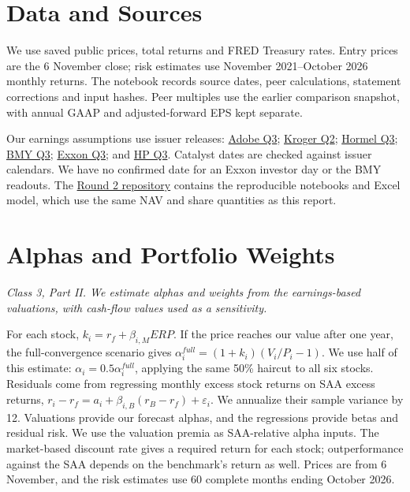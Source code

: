 \documentclass[10pt,a4paper]{article}
\begin{document}
\section*{Data and Sources}
\begingroup\small
We use saved public prices, total returns and FRED Treasury rates. Entry prices are the 6 November close; risk estimates use November 2021--October 2026 monthly returns. The notebook records source dates, peer calculations, statement corrections and input hashes. Peer multiples use the earlier comparison snapshot, with annual GAAP and adjusted-forward EPS kept separate.

Our earnings assumptions use issuer releases: \href{https://www.sec.gov/Archives/edgar/data/796343/000079634326000147/adbeex991q326.htm}{Adobe Q3}; \href{https://ir.kroger.com/news/news-details/2026/Kroger-Reports-Second-Quarter-2026-Results-and-Updates-Guidance-for-2026/default.aspx}{Kroger Q2}; \href{https://www.hormelfoods.com/wp-content/uploads/Hormel-Earnings-Release-Q3-2026_FINAL.pdf}{Hormel Q3}; \href{https://www.bms.com/assets/bms/us/en-us/pdf/investor-info/doc_financials/quarterly_reports/2026/BMY-Q3-2026-Earnings-Press-Release-0039.pdf}{BMY Q3}; \href{https://investor.exxonmobil.com/company-information/press-releases/detail/1213/exxonmobil-announces-third-quarter-2026-results}{Exxon Q3}; and \href{https://www.hp.com/content/dam/sites/garage-press/press/press-releases/2026/q3-fy26-earnings/HP_Inc_Reports_Q3FY26_Earnings.pdf}{HP Q3}. Catalyst dates are checked against issuer calendars. We have no confirmed date for an Exxon investor day or the BMY readouts. The \href{https://github.com/kybeka/meridian-capital/tree/main/research/round-2}{Round 2 repository} contains the reproducible notebooks and Excel model, which use the same NAV and share quantities as this report.
\endgroup
\clearpage
\section{Alphas and Portfolio Weights}
\label{sec:cp1}
\textit{Class 3, Part II. We estimate alphas and weights from the earnings-based valuations, with cash-flow values used as a sensitivity.}

For each stock, $k_i=r_f+\beta_{i,M}ERP$. If the price reaches our value after one year, the full-convergence scenario gives $\alpha_i^{full}=(1+k_i)(V_i/P_i-1)$. We use half of this estimate: $\alpha_i=0.5\alpha_i^{full}$, applying the same 50\% haircut to all six stocks. Residuals come from regressing monthly excess stock returns on SAA excess returns, $r_i-r_f=a_i+\beta_{i,B}(r_B-r_f)+\varepsilon_i$. We annualize their sample variance by 12. Valuations provide our forecast alphas, and the regressions provide betas and residual risk. We use the valuation premia as SAA-relative alpha inputs. The market-based discount rate gives a required return for each stock; outperformance against the SAA depends on the benchmark's return as well. Prices are from 6 November, and the risk estimates use 60 complete months ending October 2026.
\end{document}

